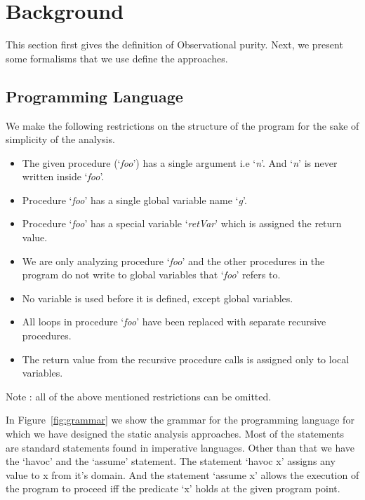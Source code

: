 \documentclass{llncs}
\newcommand{\foo}{\textit{foo}}
\newcommand{\retVar}{\textit{retVar}}
\newcommand{\n}{\textit{n}}
\newcommand{\g}{\textit{g}}
\begin{document}
\section{Background} \label{sec:background}
This section first gives the definition of Observational purity. Next,
we present some formalisms that we use define the approaches.

\subsection{Programming Language}
We make the following restrictions on the structure of the program for
the sake of simplicity of the analysis.

\begin{itemize}
\item The given procedure (`\foo') has a single argument i.e `\n'. And
  `\n' is never written inside `\foo'.
\item Procedure `\foo' has a single global variable name `\g'.
\item Procedure `\foo' has a special variable `\retVar' which is
  assigned the return value.
\item We are only analyzing procedure `\foo' and the other procedures
  in the program do not write to global variables that `\foo' refers
  to.
\item No variable is used before it is defined, except global
  variables.
\item All loops in procedure `\foo' have been replaced with separate
  recursive procedures.
\item The return value from the recursive procedure calls is assigned
  only to local variables.
\end{itemize}

Note : all of the above mentioned restrictions can be omitted.


In Figure~\ref{fig:grammar} we show the grammar for the programming
language for which we have designed the static analysis approaches.
Most of the statements are standard statements found in imperative
languages. Other than that we have the `havoc' and the `assume'
statement. The statement `havoc x' assigns any value to x from it's
domain. And the statement `assume x' allows the execution of the
program to proceed iff the predicate `x' holds at the given program
point.
\end{document}
